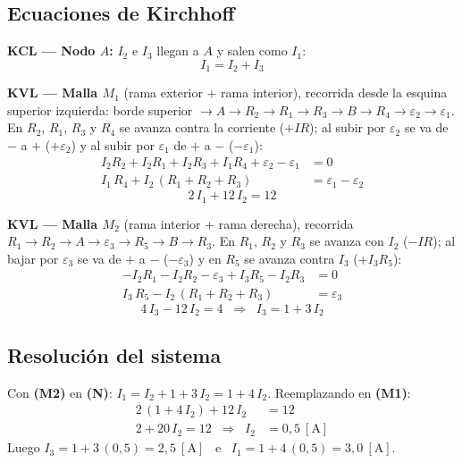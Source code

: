 \documentclass[12pt,letterpaper]{article}
\begin{document}
\subsection*{Ecuaciones de Kirchhoff}

\textbf{KCL --- Nodo $A$:} $I_2$ e $I_3$ llegan a $A$ y salen como $I_1$:
\[
    \boxed{I_1 = I_2 + I_3} \tag{N}
\]

\textbf{KVL --- Malla $M_1$} (rama exterior + rama interior), recorrida desde la esquina superior
izquierda: borde superior $\to A\to R_2\to R_1\to R_3\to B\to R_4\to\varepsilon_2\to\varepsilon_1$.
En $R_2$, $R_1$, $R_3$ y $R_4$ se avanza contra la corriente ($+IR$); al subir por $\varepsilon_2$
se va de $-$ a $+$ ($+\varepsilon_2$) y al subir por $\varepsilon_1$ de $+$ a $-$ ($-\varepsilon_1$):
\begin{align*}
    I_2R_2 + I_2R_1 + I_2R_3 + I_1R_4 + \varepsilon_2 - \varepsilon_1 &= 0\\[2pt]
    I_1\,R_4 + I_2\,(R_1+R_2+R_3) &= \varepsilon_1 - \varepsilon_2
\end{align*}
\[
    \boxed{2\,I_1 + 12\,I_2 = 12} \tag{M1}
\]

\textbf{KVL --- Malla $M_2$} (rama interior + rama derecha), recorrida
$R_1\to R_2\to A\to\varepsilon_3\to R_5\to B\to R_3$. En $R_1$, $R_2$ y $R_3$ se avanza con $I_2$
($-IR$); al bajar por $\varepsilon_3$ se va de $+$ a $-$ ($-\varepsilon_3$) y en $R_5$ se avanza
contra $I_3$ ($+I_3R_5$):
\begin{align*}
    -I_2R_1 - I_2R_2 - \varepsilon_3 + I_3R_5 - I_2R_3 &= 0\\[2pt]
    I_3\,R_5 - I_2\,(R_1+R_2+R_3) &= \varepsilon_3
\end{align*}
\[
    \boxed{4\,I_3 - 12\,I_2 = 4 \;\;\Rightarrow\;\; I_3 = 1 + 3\,I_2} \tag{M2}
\]

\subsection*{Resoluci\'on del sistema}

Con \textbf{(M2)} en \textbf{(N)}: $I_1 = I_2 + 1 + 3\,I_2 = 1 + 4\,I_2$. Reemplazando en
\textbf{(M1)}:
\begin{align*}
    2\,(1 + 4\,I_2) + 12\,I_2 &= 12\\[2pt]
    2 + 20\,I_2 = 12 \;\;\Rightarrow\;\; I_2 &= 0{,}5\ [\text{A}]
\end{align*}
Luego $I_3 = 1 + 3\,(0{,}5) = 2{,}5\ [\text{A}]$ \ e \ $I_1 = 1 + 4\,(0{,}5) = 3{,}0\ [\text{A}]$.
\end{document}
